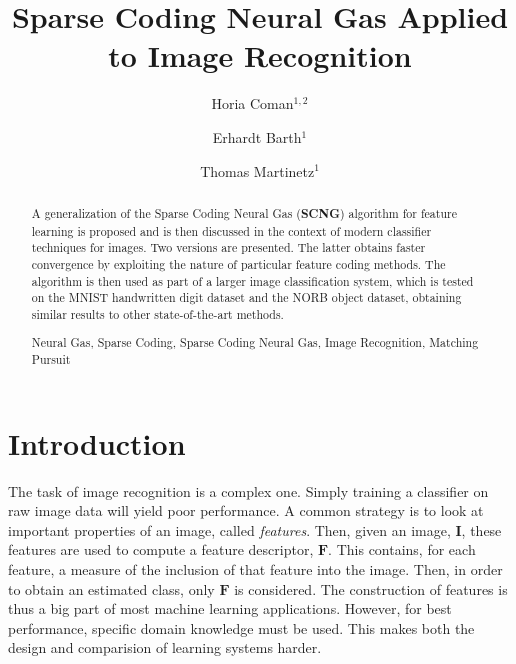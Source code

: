 \documentclass[runningheads,a4paper]{llncs}
\newcommand{\keywords}[1]{\par\addvspace\baselineskip
\noindent\keywordname\enspace\ignorespaces#1}
\begin{document}
\mainmatter

\title{Sparse Coding Neural Gas Applied to Image Recognition}

\author{Horia Coman$^{1,2}$ \and Erhardt Barth$^{1}$ \and Thomas Martinetz$^{1}$}



\maketitle

\begin{abstract} A generalization of the Sparse Coding Neural Gas (\textbf{SCNG}) algorithm for feature learning is proposed and is then discussed in the context of modern classifier techniques for images. Two versions are presented. The latter  obtains faster convergence by exploiting the nature of particular feature coding methods. The algorithm is then used as part of a larger image classification system, which is tested on the MNIST handwritten digit dataset and the NORB object dataset, obtaining similar results to other state-of-the-art methods.
\keywords{Neural Gas, Sparse Coding, Sparse Coding Neural Gas, Image Recognition, Matching Pursuit}
\end{abstract}

\section{Introduction}

The task of image recognition is a complex one. Simply training a classifier on raw image data will yield poor performance. A common strategy is to look at important properties of an image, called \emph{features}. Then, given an image, $\textbf{I}$, these features are used to compute a feature descriptor, $\textbf{F}$. This contains, for each feature, a measure of the inclusion of that feature into the image. Then, in order to obtain an estimated class, only $\textbf{F}$ is considered. The construction of features is thus a big part of most machine learning applications. However, for best performance, specific domain knowledge must be used. This makes both the design and comparision of learning systems harder.
\end{document}
